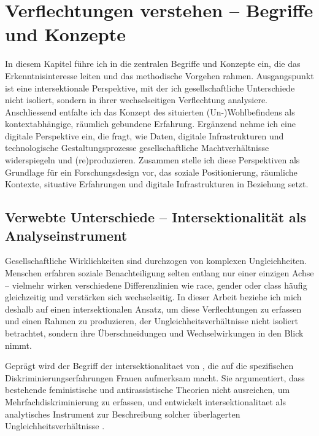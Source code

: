 
\chapter{Verflechtungen verstehen -- Begriffe und Konzepte} \label{sec:theoretischer_rahmen}

In diesem Kapitel führe ich in die zentralen Begriffe und Konzepte ein, die das Erkenntnisinteresse leiten und das methodische Vorgehen rahmen. Ausgangspunkt ist eine intersektionale Perspektive, mit der ich gesellschaftliche Unterschiede nicht isoliert, sondern in ihrer wechselseitigen Verflechtung analysiere. Anschliessend entfalte ich das Konzept des situierten (Un-)Wohlbefindens als kontextabhängige, räumlich gebundene Erfahrung. Ergänzend nehme ich eine digitale Perspektive ein, die fragt, wie Daten, digitale Infrastrukturen und technologische Gestaltungsprozesse gesellschaftliche Machtverhältnisse widerspiegeln und (re)produzieren. Zusammen stelle ich diese Perspektiven als Grundlage für ein Forschungsdesign vor, das soziale Positionierung, räumliche Kontexte, situative Erfahrungen und digitale Infrastrukturen in Beziehung setzt.

\section{Verwebte Unterschiede -- Intersektionalität als Analyseinstrument}

Gesellschaftliche Wirklichkeiten sind durchzogen von komplexen Ungleichheiten. Menschen erfahren soziale Benachteiligung selten entlang nur einer einzigen Achse -- vielmehr wirken verschiedene Differenzlinien wie \gls{race}, \gls{gender} oder \gls{class} häufig gleichzeitig und verstärken sich wechselseitig. In dieser Arbeit beziehe ich mich deshalb auf einen intersektionalen Ansatz, um diese Verflechtungen zu erfassen und einen Rahmen zu produzieren, der Ungleichheitsverhältnisse nicht isoliert betrachtet, sondern ihre Überschneidungen und Wechselwirkungen in den Blick nimmt.

Geprägt wird der Begriff der \gls{intersektionalitaet} von \textcite{crenshawMappingMarginsIntersectionality1991}, die auf die spezifischen Diskriminierungserfahrungen \emph{}\footnotemark Frauen aufmerksam macht. Sie argumentiert, dass bestehende feministische und antirassistische Theorien nicht ausreichen, um Mehrfachdiskriminierung zu erfassen, und entwickelt \gls{intersektionalitaet} als analytisches Instrument zur Beschreibung solcher überlagerten Ungleichheitsverhältnisse \parencite[\gls{vgl}][]{hancockWhenMultiplicationDoesnt2007}.

